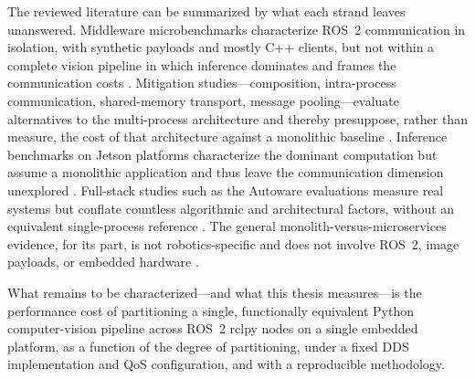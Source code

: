 The reviewed literature can be summarized by what each strand leaves
unanswered. Middleware microbenchmarks characterize ROS~2 communication
in isolation, with synthetic payloads and mostly C++ clients, but not
within a complete vision pipeline in which inference dominates and frames
the communication costs \cite{maruyama2016, kronauer2021, kamiya2025,luo2025, macenski2022}. Mitigation studies---composition, intra-process
communication, shared-memory transport, message pooling---evaluate
alternatives to the multi-process architecture and thereby presuppose,
rather than measure, the cost of that architecture against a monolithic
baseline \cite{macenski2023, kamiya2025, luo2025}. Inference benchmarks
on Jetson platforms characterize the dominant computation but assume a
monolithic application and thus leave the communication dimension
unexplored \cite{szegedi2026, zequn2026, alqahtani2026, scalcon2024}.
Full-stack studies such as the Autoware evaluations measure real systems
but conflate countless algorithmic and architectural factors, without an
equivalent single-process reference \cite{betz2023a, betz2024}. The
general monolith-versus-microservices evidence, for its part, is not
robotics-specific and does not involve ROS~2, image payloads, or embedded
hardware \cite{tapia2020, blinowski2022, felisberto2024}.

What remains to be characterized---and what this thesis measures---is the
performance cost of partitioning a single, functionally equivalent Python
computer-vision pipeline across ROS~2 rclpy nodes on a single embedded
platform, as a function of the degree of partitioning, under a fixed DDS
implementation and QoS configuration, and with a reproducible methodology.
